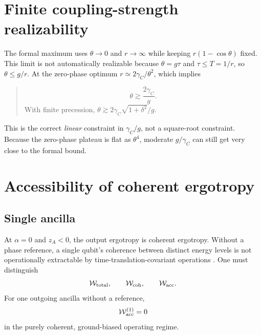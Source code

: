 \documentclass[11pt,a4paper]{article}
\newcommand{\W}{\mathcal{W}}
\newenvironment{resultbox}{\begin{quote}\small\color{blue!40!black}}{\end{quote}}
\begin{document}
\section{Finite coupling-strength realizability}\label{sec:realizable}

The formal maximum uses $\theta\to0$ and $r\to\infty$ while keeping $r(1-\cos\theta)$ fixed. This limit is not automatically realizable because $\theta=g\tau$ and $\tau\le T=1/r$, so $\theta\le g/r$. At the zero-phase optimum $r\simeq 2\gamma_C/\theta^2$, which implies
\begin{resultbox}
\begin{equation}
\theta\gtrsim\frac{2\gamma_C}{g}.
\end{equation}
With finite precession, $\theta\gtrsim 2\gamma_C\sqrt{1+\delta^2}/g$.
\end{resultbox}
This is the correct \emph{linear} constraint in $\gamma_C/g$, not a square-root constraint. Because the zero-phase plateau is flat as $\theta^4$, moderate $g/\gamma_C$ can still get very close to the formal bound.

\section{Accessibility of coherent ergotropy}\label{sec:access}

\subsection{Single ancilla}

At $\alpha=0$ and $z_A<0$, the output ergotropy is coherent ergotropy. Without a phase reference, a single qubit's coherence between distinct energy levels is not operationally extractable by time-translation-covariant operations \cite{RefFrames}. One must distinguish
\begin{equation}
\W_{\rm total},\qquad \W_{\rm coh},\qquad \W_{\rm acc}.
\end{equation}
For one outgoing ancilla without a reference,
\begin{equation}
\W_{\rm acc}^{(1)}=0
\end{equation}
in the purely coherent, ground-biased operating regime.
\end{document}
